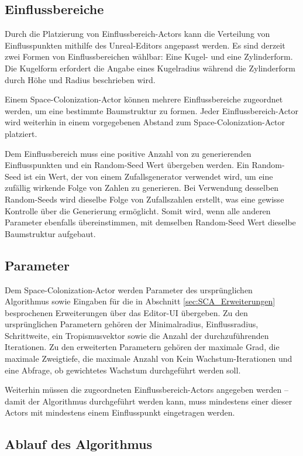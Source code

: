 \subsection{Einflussbereiche}

Durch die Platzierung von Einflussbereich-Actors kann die Verteilung von Einflusspunkten mithilfe des Unreal-Editors angepasst werden. Es sind derzeit zwei Formen von Einflussbereichen wählbar: Eine Kugel- und eine Zylinderform. Die Kugelform erfordert die Angabe eines Kugelradius während die Zylinderform durch Höhe und Radius beschrieben wird. 

Einem Space-Colonization-Actor können mehrere Einflussbereiche zugeordnet werden, um eine bestimmte Baumstruktur zu formen. Jeder Einflussbereich-Actor wird weiterhin in einem vorgegebenen Abstand zum Space-Colonization-Actor platziert.

Dem Einflussbereich muss eine positive Anzahl von zu generierenden Einflusspunkten und ein Random-Seed Wert übergeben werden. Ein Random-Seed ist ein Wert, der von einem Zufallsgenerator verwendet wird, um eine zufällig wirkende Folge von Zahlen zu generieren. Bei Verwendung desselben Random-Seeds wird dieselbe Folge von Zufallszahlen erstellt, was eine gewisse Kontrolle über die Generierung ermöglicht. Somit wird, wenn alle anderen Parameter ebenfalls übereinstimmen, mit demselben Random-Seed Wert dieselbe Baumstruktur aufgebaut. 

\subsection{Parameter}

Dem Space-Colonization-Actor werden Parameter des ursprünglichen Algorithmus sowie Eingaben für die in Abschnitt \ref{sec:SCA_Erweiterungen} besprochenen Erweiterungen über das Editor-UI übergeben. Zu den ursprünglichen Parametern gehören der Minimalradius, Einflussradius, Schrittweite, ein Tropismusvektor sowie die Anzahl der durchzuführenden Iterationen. Zu den erweiterten Parametern gehören der maximale Grad, die maximale Zweigtiefe, die maximale Anzahl von \glqq Kein Wachstum\grqq{}-Iterationen und eine Abfrage, ob gewichtetes Wachstum durchgeführt werden soll.

Weiterhin müssen die zugeordneten Einflussbereich-Actors angegeben werden -- damit der Algorithmus durchgeführt werden kann, muss mindestens einer dieser Actors mit mindestens einem Einflusspunkt eingetragen werden.

\subsection{Ablauf des Algorithmus}

